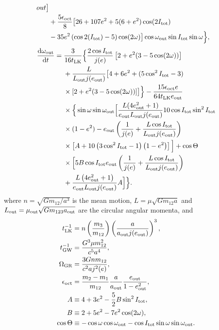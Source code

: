\documentclass[10pt]{article}%
\newcommand*{\rd}[2]{\frac{\mathrm{d}#1}{\mathrm{d}#2}}
\newcommand*{\p}[1]{\left(#1\right)}
\newcommand*{\s}[1]{\left[#1\right]}
\begin{document}
{\begin{align}
{            out}\big]\nonumber\\
        &+ \frac{5\epsilon_{\rm oct}}{8}\big[26 + 107e^2
            + 5(6 + e^2)\cos(2I_{\rm tot})\nonumber\\
        &- 35 e^2\p{\cos 2(I_{\rm tot}) - 5} \cos (2\omega)\big]
            \cos \omega_{\rm out}\sin I_{\rm tot} \sin \omega\Big\},
\end{align}
\begin{align}
    \rd{\omega_{\rm out}}{t} ={}&
        \frac{3}{16t_{\rm LK}}\Big\{\frac{2\cos I_{\rm tot}}{j(e)}
            \s{2 + e^2(3 - 5\cos(2\omega))}\nonumber\\
        &+ \frac{L}{L_{\rm out}j(e_{\rm out})}\big[4 + 6e^2
            + (5\cos^2 I_{\rm tot} - 3)\nonumber\\
        &\times [2 + e^2(3 - 5\cos(2\omega))]\big]\Big\}
            - \frac{15 \epsilon_{\rm oct}e}{64t_{\rm LK}e_{\rm out}}\nonumber\\
        &\times \Big\{ \sin \omega \sin \omega_{\rm out}\Big[
            \frac{L(4e_{\rm out}^2 + 1)}{e_{\rm out}L_{\rm out} j(e_{\rm out})}
            10 \cos I_{\rm tot}\sin^2 I_{\rm tot}\nonumber\\
        &\times(1 - e^2) - e_{\rm out}\p{\frac{1}{j(e)} +
            \frac{L \cos I_{\rm tot}}{L_{\rm out}j(e_{\rm out})}}\nonumber\\
        &\times\s{A + 10\p{3\cos^2 I_{\rm tot} - 1}\p{1 - e^2}}\Big]
            + \cos \Theta\nonumber\\
        &\times \Big[5B\cos I_{\rm tot}e_{\rm out}\p{\frac{1}{j(e)} +
            \frac{L \cos I_{\rm tot}}{L_{\rm out}j(e_{\rm out})}}\nonumber\\
        &+ \frac{L\p{4e_{\rm out}^2 + 1}}{e_{\rm out}L_{\rm out}j(e_{\rm out})}
            A\Big]\Big\}.
\end{align}
}
where $n = \sqrt{Gm_{12} / a^3}$ is the mean motion, $L = \mu \sqrt{Gm_{12}a}$
and $L_{\rm out} = \mu_{\rm out}\sqrt{Gm_{123}a_{\rm out}}$ are the circular
angular momenta, and
\begin{align}
    t_{\rm LK}^{-1} &= n\p{\frac{m_3}{m_{12}}}\p{\frac{a}{a_{\rm out}j(e_{\rm
        out})}}^3,\\
    t_{\rm GW}^{-1} &= \frac{G^3\mu m_{12}^2}{c^5a^4},\\
    \Omega_{\rm GR} &= \frac{3Gnm_{12}}{c^2aj^2(e)},\\
    \epsilon_{\rm oct} &= \frac{m_2 - m_1}{m_{12}}\frac{a}{a_{\rm out}}
        \frac{e_{\rm out}}{1 - e_{\rm out}^2},\\
    A &\equiv 4 + 3e^2 - \frac{5}{2}B\sin^2 I_{\rm tot},\\
    B &\equiv 2 + 5e^2 - 7e^2 \cos(2\omega),\\
    \cos \Theta &\equiv -\cos \omega \cos \omega_{\rm out}
        - \cos I_{\rm tot} \sin \omega \sin \omega_{\rm out}.
\end{align}
\end{document}
